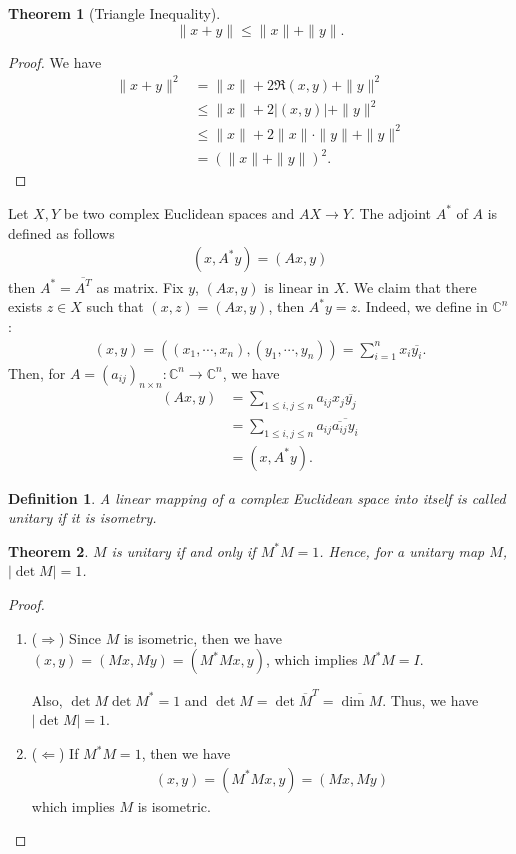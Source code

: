 \documentclass[11pt]{book}
\newtheorem{definition}{Definition}[section]
\newtheorem{theorem}{Theorem}[section]
\theoremstyle{definition}
\numberwithin{equation}{subsection}
\begin{document}
\medskip

\begin{theorem}[Triangle Inequality]
$$\|x+y\| \leq \|x\| + \|y\|.$$
\end{theorem}
\begin{proof}
We have
\begin{align*}
    \|x+y\|^2 & = \|x\| + 2 \Re(x,y) + \|y\|^2 \\
    & \leq \|x\| + 2\left|(x,y)\right| + \|y\|^2 \\
    & \leq \|x\| + 2 \|x\| \cdot \|y\| + \|y\|^2 \\
    & = (\|x\| + \|y\|)^2.
\end{align*}
\end{proof}

\medskip

Let $X, Y$ be two complex Euclidean spaces and $AX\to Y$. The adjoint $A^*$ of $A$ is defined as follows 
\begin{align*}
    (x, A^* y) = (Ax, y)
\end{align*}
then $A^* = \overline{A^T}$ as matrix. Fix $y$, $(Ax, y)$ is linear in $X$. We claim that there exists $z\in X$ such that $(x,z) = (Ax, y)$, then $A^* y = z$. Indeed, we define in $\mathbb{C}^n$:
\begin{align*}
    (x,y) = \left((x_1,\cdots,x_n), (y_1,\cdots,y_n)\right) = \sum^n_{i=1}x_i \overline{y_i}.
\end{align*}
Then, for $A = (a_{ij})_{n\times n}:\mathbb{C}^n \to \mathbb{C}^n$, we have
\begin{align*}
    (Ax, y) & = \sum_{1\leq i,j\leq n}a_{ij} x_j \overline{y_j} \\
    & = \sum_{1\leq i,j\leq n}a_{ij} \overline{\overline{a_{ij}} y_i} \\
    & = (x, A^* y).
\end{align*}

\medskip

\begin{definition}
A linear mapping of a complex Euclidean space into itself is called unitary if it is isometry.
\end{definition}

\medskip

\begin{theorem}
$M$ is unitary if and only if $M^*M = 1$. Hence, for a unitary map $M$, $|\det M| = 1$.
\end{theorem}
\begin{proof}
~\begin{enumerate}[label=(\arabic*)]
    \item ($\Rightarrow$) Since $M$ is isometric, then we have $(x,y) = (Mx, My) = (M^* M x, y)$, which implies $M^* M = I$.
    
    Also, $\det M \det M^* = 1$ and $\det M = \det \overline{M}^T = \overline{\dim M}$. Thus, we have $|\det M| = 1$.
    \item ($\Leftarrow$) If $M^*M = 1$, then we have
    \begin{align*}
        (x,y) = (M^* M x, y) = (Mx, My)
    \end{align*}
    which implies $M$ is isometric.
\end{enumerate}
\end{proof}
\end{document}

